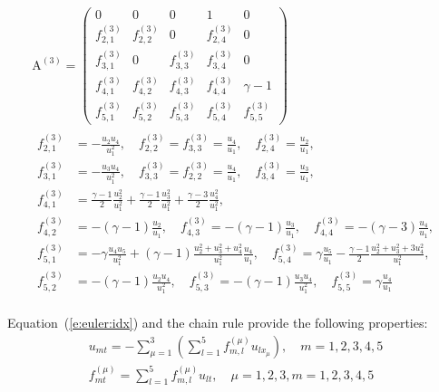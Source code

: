 \documentclass{turgon}
\begin{document}
\begin{gather}
  \begin{gathered}
    \mathrm{A}^{(3)} = \left(
    \begin{array}{ccccc}
      0             & 0             & 0             & 1             & 0 \\
      f^{(3)}_{2,1} & f^{(3)}_{2,2} & 0             & f^{(3)}_{2,4} & 0 \\
      f^{(3)}_{3,1} & 0             & f^{(3)}_{3,3} & f^{(3)}_{3,4} & 0 \\
      f^{(3)}_{4,1} & f^{(3)}_{4,2} & f^{(3)}_{4,3} & f^{(3)}_{4,4} &
      \gamma - 1 \\
      f^{(3)}_{5,1} & f^{(3)}_{5,2} & f^{(3)}_{5,3} & f^{(3)}_{5,4} &
      f^{(3)}_{5,5}
    \end{array}
    \right)
    \\
    \begin{aligned}
      f^{(3)}_{2,1} &= -\frac{u_2 u_4}{u_1^2}, \quad
      f^{(3)}_{2,2} = f^{(3)}_{3,3} = \frac{u_4}{u_1}, \quad
      f^{(3)}_{2,4} = \frac{u_2}{u_1}, \\
      f^{(3)}_{3,1} &= -\frac{u_3 u_4}{u_1^2}, \quad
      f^{(3)}_{3,3} = f^{(3)}_{2,2} = \frac{u_4}{u_1}, \quad
      f^{(3)}_{3,4} = \frac{u_3}{u_1}, \\
      f^{(3)}_{4,1} &= \frac{\gamma-1}{2}\frac{u_2^2}{u_1^2}
      + \frac{\gamma-1}{2}\frac{u_3^2}{u_1^2}
      + \frac{\gamma-3}{2}\frac{u_4^2}{u_1^2}, \\
      f^{(3)}_{4,2} &= -(\gamma-1)\frac{u_2}{u_1}, \quad
      f^{(3)}_{4,3} = -(\gamma-1)\frac{u_3}{u_1}, \quad
      f^{(3)}_{4,4} = -(\gamma-3)\frac{u_4}{u_1}, \\
      f^{(3)}_{5,1} &= -\gamma\frac{u_4 u_5}{u_1^2}
      + (\gamma-1)\frac{u_2^2+u_3^2+u_4^2}{u_1^2}\frac{u_4}{u_1}, \quad
      f^{(3)}_{5,4} = \gamma\frac{u_5}{u_1}
      - \frac{\gamma-1}{2}\frac{u_2^2 + u_3^2 + 3u_4^2}{u_1^2}, \\
      f^{(3)}_{5,2} &= -(\gamma-1)\frac{u_2 u_4}{u_1^2}, \quad
      f^{(3)}_{5,3} = -(\gamma-1)\frac{u_3 u_4}{u_1^2}, \quad
      f^{(3)}_{5,5} = \gamma\frac{u_4}{u_1}
    \end{aligned}
  \end{gathered}
  \label{e:euler:jaco3}
\end{gather}

Equation~(\ref{e:euler:idx}) and the chain rule provide the following
properties:
%
\begin{gather}
  u_{mt} =
  -\sum_{\mu=1}^3
  \left(
  \sum_{l=1}^5 f^{(\mu)}_{m,l} u_{lx_{\mu}}
  \right),
  \quad m = 1, 2, 3, 4, 5
  \label{e:euler:ut}
  \\
  f^{(\mu)}_{mt} =
  \sum_{l=1}^5 f^{(\mu)}_{m,l} u_{lt},
  \quad \mu = 1, 2, 3, m = 1, 2, 3, 4, 5
  \label{e:euler:ft}
\end{gather}
\end{document}
